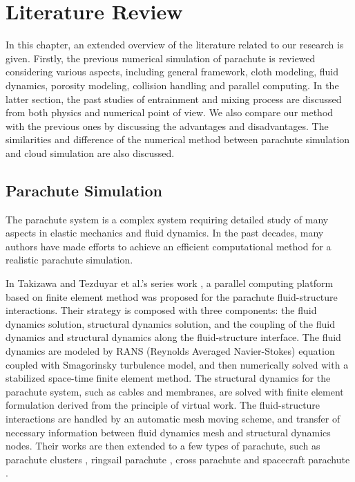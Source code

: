 \chapter{Literature Review}\label{literature}
In this chapter, an extended overview of the literature related to our research is 
given. Firstly, the previous numerical simulation of parachute is reviewed considering
various aspects, including general framework, cloth modeling, fluid dynamics, 
porosity modeling, collision handling and parallel computing. 
In the latter section, the past studies of entrainment and mixing process are discussed from both physics and numerical point of view. We also compare our method with the previous ones by discussing the advantages and disadvantages. 
The similarities and difference of the numerical method between parachute simulation and cloud simulation are also discussed.

\section{Parachute Simulation}
The parachute system is a complex system requiring
detailed study of many aspects in elastic mechanics and fluid dynamics. In the
past decades, many authors have made efforts to achieve an efficient
computational method for a realistic parachute simulation.  

In Takizawa and Tezduyar et al.'s series work \cite{Stein2000,Kalro2000}, 
a parallel computing platform based on finite element method was proposed for the 
parachute fluid-structure interactions. Their strategy is composed with three 
components: the fluid dynamics solution, structural dynamics solution, and the 
coupling of the fluid dynamics and structural dynamics along the fluid-structure 
interface. The fluid dynamics are modeled by RANS (Reynolds Averaged Navier-Stokes) equation coupled with Smagorinsky turbulence model, and then numerically solved with a stabilized space-time finite element method. The structural dynamics for the parachute system, such as cables and membranes, are solved with finite element formulation derived from the principle of virtual work. The fluid-structure interactions are
handled by an automatic mesh moving scheme, and transfer of necessary information between fluid dynamics mesh and structural dynamics nodes. Their works are then extended to a few types of parachute, such as parachute clusters \cite{Takizawa2010}, ringsail parachute \cite{Tezduyar2008}, cross parachute \cite{Stein2001} and spacecraft parachute \cite{Takizawa2013}.

